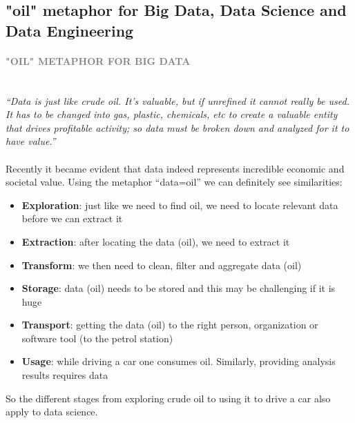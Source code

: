 \documentclass[10pt,a4paper]{article}
\newcommand{\nline}{\\~\\}
\newcommand{\myparagraph}[1]{\paragraph{\normalsize{\textcolor{gray}{\uppercase{\textbf{#1}}}} }\mbox{} \vspace{0.5em}\\}
\begin{document}
\subsection{"oil" metaphor for Big Data, Data Science and Data Engineering}
\myparagraph{"oil" metaphor for Big Data}
\textit{“Data is just like crude oil. It’s valuable, but if unrefined it cannot really be used. It has to be changed into gas, plastic, chemicals, etc to create a valuable entity that drives profitable activity; so data must be broken down and analyzed for it to have value.”}
\nline
Recently it became evident that data indeed represents incredible economic and societal value. Using the metaphor “data=oil” we can definitely see similarities:
\begin{itemize}
	\item \textbf{Exploration}: just like we need to find oil, we need to locate relevant data before we can extract it
	\item \textbf{Extraction}: after locating the data (oil), we need to extract it
	\item \textbf{Transform}: we then need to clean, filter and aggregate data (oil)
	\item \textbf{Storage}: data (oil) needs to be stored and this may be challenging if it is huge
	\item \textbf{Transport}: getting the data (oil) to the right person, organization or software tool (to the petrol station)
	\item \textbf{Usage}: while driving a car one consumes oil. Similarly, providing analysis results requires data
\end{itemize}
So the different stages from exploring crude oil to using it to drive a car also apply to data science. 
\end{document}

